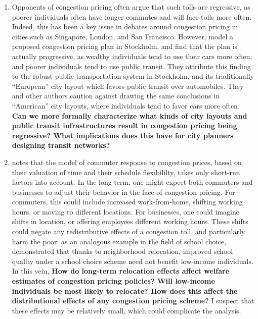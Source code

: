 \documentclass[JEL]{AEA}
\begin{document}
\begin{enumerate}

\item Opponents of congestion pricing often argue that such tolls are regressive, as poorer individuals often have longer commutes and will face tolls more often. Indeed, this has been a key issue in debates around congestion pricing in cities such as Singapore, London, and San Francisco. However, \cite{eliasson-2006} model a proposed congestion pricing plan in Stockholm, and find that the plan is actually progressive, as wealthy individuals tend to use their cars more often, and poorer individuals tend to use public transit. They attribute this finding to the robust public transportation system in Stockholm, and its traditionally ``European” city layout which favors public transit over automobiles. They and other authors caution against drawing the same conclusions in ``American” city layouts, where individuals tend to favor cars more often. \textbf{Can we more formally characterize what kinds of city layouts and public transit infrastructures result in congestion pricing being regressive? What implications does this have for city planners designing transit networks?}

\item \cite{kreindler-2018} notes that the model of commuter response to congestion prices, based on their valuation of time and their schedule flexibililty, takes only short-run factors into account. In the long-term, one might expect both commuters and businesses to adjust their behavior in the face of congestion pricing. For commuters, this could include increased work-from-home, shifting working hours, or moving to different locations. For businesses, one could imagine shifts in location, or offering employees different working hours. These shifts could negate any redistributive effects of a congestion toll, and particularly harm the poor: as an analogous example in the field of school choice, \cite{avery-2021} demonstrated that thanks to neighborhood relocation, improved school quality under a school choice scheme need not benefit low-income individuals. In this vein, \textbf{How do long-term relocation effects affect welfare estimates of congestion pricing policies? Will low-income individuals be most likely to relocate? How does this affect the distributional effects of any congestion pricing scheme?} I suspect that these effects may be relatively small, which could complicate the analysis.


\end{enumerate}
\end{document}
